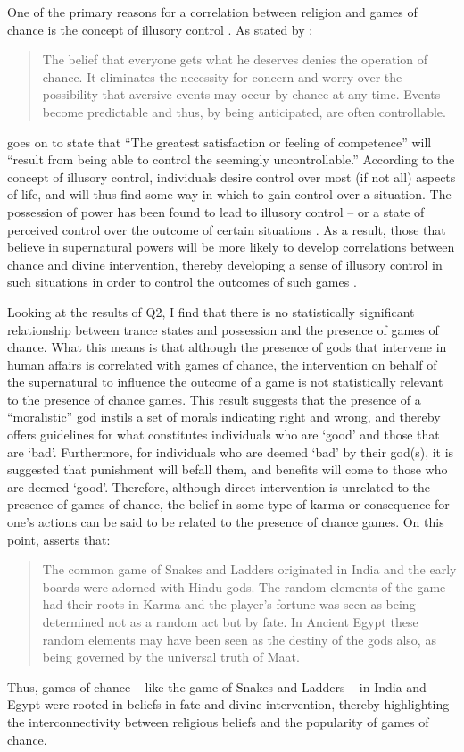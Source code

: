 One of the primary reasons for a correlation between religion and games of chance is the concept of illusory control \parencites[see][]{wohl2002}{langer1975}. As stated by \textcite[312]{langer1975}: 
\begin{quote}
The belief that everyone gets what he deserves denies the operation of chance. It eliminates the necessity for concern and worry over the possibility that aversive events may occur by chance at any time. Events become predictable and thus, by being anticipated, are often controllable.
\end{quote}
\textcite[323]{langer1975} goes on to state that ``The greatest satisfaction or feeling of competence” will ``result from being able to control the seemingly uncontrollable.” According to the concept of illusory control, individuals desire control over most (if not all) aspects of life, and will thus find some way in which to gain control over a situation. The possession of power has been found to lead to illusory control – or a state of perceived control over the outcome of certain situations \parencite{fast2009}. As a result, those that believe in supernatural powers will be more likely to develop correlations between chance and divine intervention, thereby developing a sense of illusory control in such situations in order to control the outcomes of such games \parencite[1089]{tobacyk1991}.

Looking at the results of Q2, I find that there is no statistically significant relationship between trance states and possession and the presence of games of chance. What this means is that although the presence of gods that intervene in human affairs is correlated with games of chance, the intervention on behalf of the supernatural to influence the outcome of a game is not statistically relevant to the presence of chance games. This result suggests that the presence of a ``moralistic” god instils a set of morals indicating right and wrong, and thereby offers guidelines for what constitutes individuals who are ‘good’ and those that are ‘bad’. Furthermore, for individuals who are deemed ‘bad’ by their god(s), it is suggested that punishment will befall them, and benefits will come to those who are deemed ‘good’. Therefore, although direct intervention is unrelated to the presence of games of chance, the belief in some type of karma or consequence for one’s actions can be said to be related to the presence of chance games. On this point, \textcite{robinson2015} asserts that:
\begin{quote}
The common game of Snakes and Ladders originated in India and the early boards were adorned with Hindu gods. The random elements of the game had their roots in Karma and the player's fortune was seen as being determined not as a random act but by fate. In Ancient Egypt these random elements may have been seen as the destiny of the gods also, as being governed by the universal truth of Maat.
\end{quote}
Thus, games of chance – like the game of Snakes and Ladders – in India and Egypt were rooted in beliefs in fate and divine intervention, thereby highlighting the interconnectivity between religious beliefs and the popularity of games of chance.

